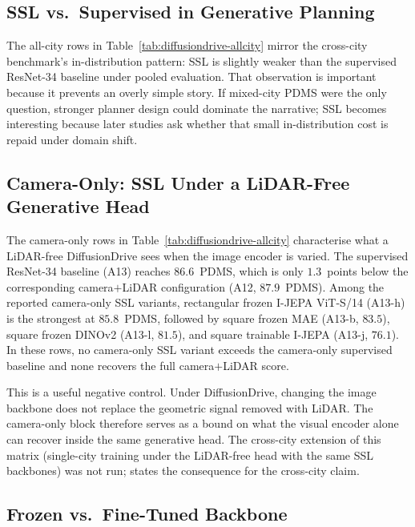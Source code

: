 \subsection{SSL vs.\ Supervised in Generative Planning}
\label{sec:exp-phase2-ssl-vs-sup}

The all-city rows in Table~\ref{tab:diffusiondrive-allcity} mirror the cross-city benchmark's in-distribution pattern: SSL is slightly weaker than the supervised ResNet-34 baseline under pooled evaluation. That observation is important because it prevents an overly simple story. If mixed-city PDMS were the only question, stronger planner design could dominate the narrative; SSL becomes interesting because later studies ask whether that small in-distribution cost is repaid under domain shift.

\subsection{Camera-Only: SSL Under a LiDAR-Free Generative Head}
\label{sec:exp-phase2-camera-only}

The camera-only rows in Table~\ref{tab:diffusiondrive-allcity} characterise what a LiDAR-free DiffusionDrive sees when the image encoder is varied. The supervised ResNet-34 baseline (A13) reaches $86.6$~PDMS, which is only $1.3$~points below the corresponding camera$+$LiDAR configuration (A12, $87.9$~PDMS). Among the reported camera-only SSL variants, rectangular frozen I-JEPA ViT-S/14 (A13-h) is the strongest at $85.8$~PDMS, followed by square frozen MAE (A13-b, $83.5$), square frozen DINOv2 (A13-l, $81.5$), and square trainable I-JEPA (A13-j, $76.1$). In these rows, no camera-only SSL variant exceeds the camera-only supervised baseline and none recovers the full camera$+$LiDAR score.

This is a useful negative control. Under DiffusionDrive, changing the image backbone does not replace the geometric signal removed with LiDAR. The camera-only block therefore serves as a bound on what the visual encoder alone can recover inside the same generative head. The cross-city extension of this matrix (single-city training under the LiDAR-free head with the same SSL backbones) was not run;  states the consequence for the cross-city claim.

\subsection{Frozen vs.\ Fine-Tuned Backbone}
\label{sec:exp-phase2-frozen}

